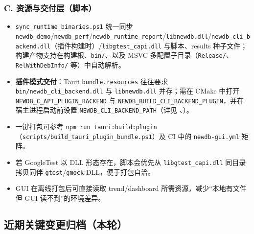 \subsubsection{C. 资源与交付层（脚本）}
\begin{itemize}
  \item \texttt{sync\_runtime\_binaries.ps1} 统一同步 \texttt{newdb\_demo}/\texttt{newdb\_perf}/\texttt{newdb\_runtime\_report}/\texttt{libnewdb.dll}/\texttt{newdb\_cli\_backend.dll}（插件构建时）/\texttt{libgtest\_capi.dll} 与脚本、results 种子文件；构建产物支持在构建根、\texttt{bin/}、以及 MSVC 多配置子目录（\texttt{Release/}、\texttt{RelWithDebInfo/} 等）中自动解析。
  \item \textbf{插件模式交付}：Tauri \texttt{bundle.resources} 往往要求 \texttt{bin/newdb\_cli\_backend.dll} 与 \texttt{libnewdb.dll} 并存；需在 CMake 中打开 \texttt{NEWDB\_C\_API\_PLUGIN\_BACKEND} 与 \texttt{NEWDB\_BUILD\_CLI\_BACKEND\_PLUGIN}，并在宿主进程启动前设置 \texttt{NEWDB\_CLI\_BACKEND\_PATH}（详见 、）。
  \item 一键打包可参考 \texttt{npm run tauri:build:plugin}（\texttt{scripts/build\_tauri\_plugin\_bundle.ps1}）及 CI 中的 \texttt{newdb-gui.yml} 矩阵。
  \item 若 GoogleTest 以 DLL 形态存在，脚本会优先从 \texttt{libgtest\_capi.dll} 同目录拷贝同伴 \texttt{gtest}/\texttt{gmock} DLL，便于打包自洽。
  \item GUI 在离线打包后可直接读取 trend/dashboard 所需资源，减少“本地有文件但 GUI 读不到”的环境差异。
\end{itemize}

\subsection{近期关键变更归档（本轮）}

